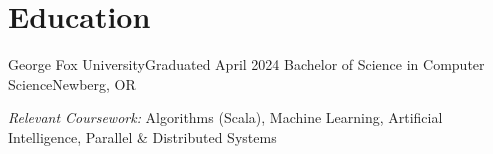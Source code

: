 \section{Education}
  \resumeSubHeadingListStart
    \resumeSubheading
        {George Fox University}{Graduated April 2024}
        {Bachelor of Science in Computer Science}{Newberg, OR}
        {\item{\small{\textit{Relevant Coursework:} Algorithms (Scala), Machine Learning, Artificial Intelligence, Parallel \& Distributed Systems}}}
  \resumeSubHeadingListEnd
